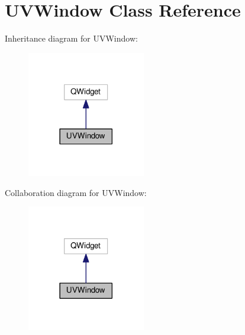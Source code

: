 \hypertarget{class_u_v_window}{\section{U\-V\-Window Class Reference}
\label{class_u_v_window}
}


Inheritance diagram for U\-V\-Window\-:
\nopagebreak
\begin{figure}[H]
\begin{center}
\leavevmode
\includegraphics[width=146pt]{class_u_v_window__inherit__graph}
\end{center}
\end{figure}


Collaboration diagram for U\-V\-Window\-:
\nopagebreak
\begin{figure}[H]
\begin{center}
\leavevmode
\includegraphics[width=146pt]{class_u_v_window__coll__graph}
\end{center}
\end{figure}
